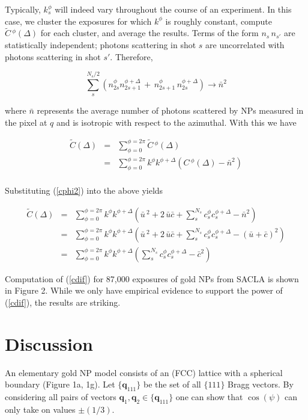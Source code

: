 \documentclass [11pt,fleqn]{article}
\def \be {\begin{equation}}
\def \ee {\end{equation}}
\def \beq {\begin{eqnarray}}
\def \eeq {\end{eqnarray}}
\begin{document}
Typically, $k_s^\phi$ will indeed vary throughout the course of an experiment. In this case, we cluster the exposures for which $k^\phi$ is roughly constant, compute $\tilde{C}\,^\phi(\Delta)$ for each cluster, and average the results. Terms of the form $n_s\, n_{s'}$ are statistically independent; photons scattering in shot $s$ are uncorrelated with photons scattering in shot $s'$. Therefore,

\be
\sum_s ^{N_s / 2} \left ( n_{2s}^\phi n_{2s+1}^{\phi+\Delta} \,+\,  n_{2s+1}^\phi\,n_{2s}^{\phi+\Delta} \right) \rightarrow \bar{n}^2
\ee

where $\bar{n}$ represents the average number of photons scattered by NPs measured in the pixel at $q$ and is isotropic with respect to the azimuthal. With this we have

\beq
\tilde{C}(\Delta) &=& \sum_{\phi=0}^{\phi=2\pi}  \tilde{C}\,^\phi(\Delta) \\
&=& \sum_{\phi=0}^{\phi=2\pi}  k^\phi k^{\phi+\Delta}  \left( C\,^\phi(\Delta) - \bar{n}^2    \right ) \\
\eeq

Substituting (\ref{cphi2}) into the above yields

\beq
\tilde{C}(\Delta) &=& \sum_{\phi=0}^{\phi=2\pi}  k^\phi k^{\phi+\Delta} \left( \bar{u}\,^2 + 2\,\bar{u}\bar{c} + \sum_s^{N_s}c_s^\phi c_s^{\phi + \Delta}  - \bar{n}^2  \right ) \\
&=&  \sum_{\phi=0}^{\phi=2\pi}  k^\phi k^{\phi+\Delta} \left( \bar{u}\,^2 + 2\,\bar{u}\bar{c} + \sum_s^{N_s}c_s^\phi c_s^{\phi + \Delta} - ( \bar{u} + \bar{c}  )^2 \right ) \\
&=& \sum_{\phi=0}^{\phi=2\pi}  k^\phi k^{\phi+\Delta} \left( \sum_s^{N_s}  c_s^\phi c_s^{\phi+\Delta} - \bar{c}^2 \right )
\eeq

Computation of (\ref{cdif}) for 87,000 exposures of gold NPs from SACLA is shown in Figure 2. While we only have empirical evidence to support the power of (\ref{cdif}), the results are striking.

\section{Discussion}
An elementary gold NP model consists of an (FCC) lattice with a spherical boundary (Figure 1a, 1g). Let $\{\bm q_{111}\}$ be the set of all $\{111\}$ Bragg vectors. By considering all pairs of vectors $\bm q_1, \bm q_2 \in \{\bm q_{111}\}$ one can show that $\cos (\psi)$ can only take on values $\pm (1/3)$. 
\end{document}
